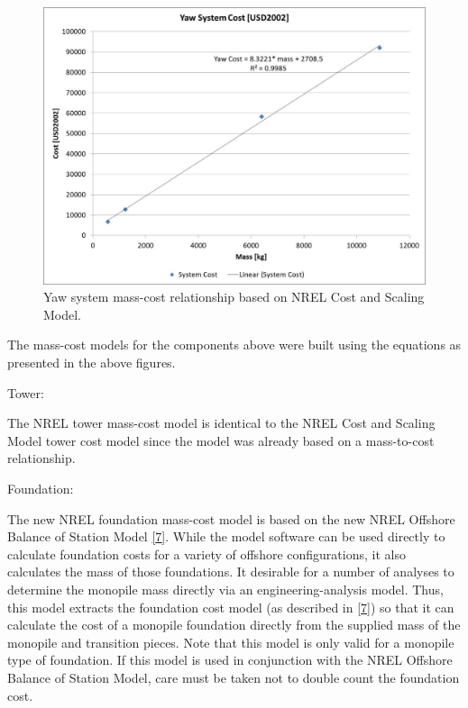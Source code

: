 \documentclass[letterpaper,10pt,openany,oneside]{sphinxmanual}
\begin{document}
\begin{figure}[htbp]
\centering
\capstart

\includegraphics[width=6.5in]{yawCost.pdf}
\caption{Yaw system mass-cost relationship based on NREL Cost and Scaling Model.}\label{theory:yawcost}\end{figure}

The mass-cost models for the components above were built using the equations as presented in the above figures.

Tower:

The NREL tower mass-cost model is identical to the NREL Cost and Scaling Model tower cost model since the model was already based on a mass-to-cost relationship.

Foundation:

The new NREL foundation mass-cost model is based on the new NREL Offshore Balance of Station Model {\hyperref[theory:7]{{[}7{]}}}.  While the model software can be used directly to calculate foundation costs for a variety of offshore configurations, it also calculates the mass of those foundations.  It desirable for a number of analyses to determine the monopile mass directly via an engineering-analysis model.  Thus, this model extracts the foundation cost model (as described in {\hyperref[theory:7]{{[}7{]}}}) so that it can calculate the cost of a monopile foundation directly from the supplied mass of the monopile and transition pieces.  Note that this model is only valid for a monopile type of foundation.  If this model is used in conjunction with the NREL Offshore Balance of Station Model, care must be taken not to double count the foundation cost.
\end{document}
